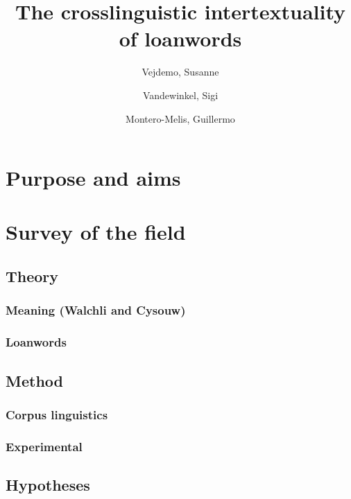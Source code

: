 \documentclass[a4paper]{article}
\title{The crosslinguistic intertextuality of loanwords}
\author{Vejdemo, Susanne \and Vandewinkel, Sigi \and Montero-Melis, Guillermo}
\begin{document}
\maketitle


\section{Purpose and aims}






\section{Survey of the field}


\subsection{Theory}


\subsubsection{Meaning (Walchli and Cysouw)}




\subsubsection{Loanwords}



\subsection{Method}


\subsubsection{Corpus linguistics}



\subsubsection{Experimental}





\subsection{Hypotheses}
\end{document}
